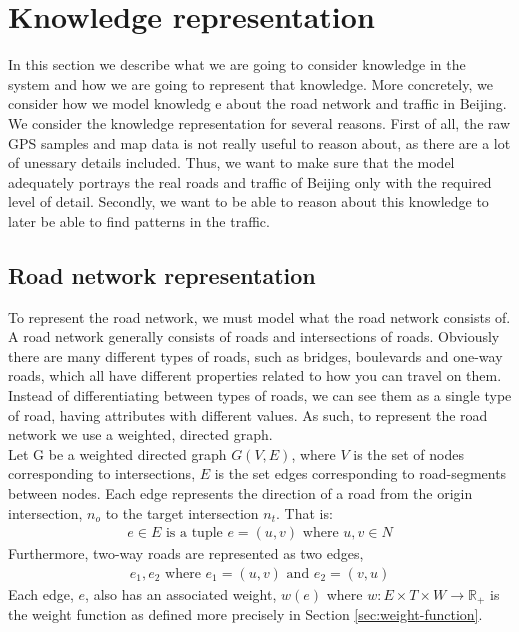 \section{Knowledge representation}
In this section we describe what we are going to consider knowledge in the system and how we are going to represent that knowledge. More concretely, we consider how we model knowledg
e about the road network and traffic in Beijing. We consider the knowledge representation for several reasons. First of all, the raw GPS samples and map data is not really useful to reason about, as there are a lot of unessary details included. Thus, we want to make sure that the model adequately portrays the real roads and traffic of Beijing only with the required level of detail. Secondly, we want to be able to reason about this knowledge to later be able to find patterns in the traffic.

\subsection{Road network representation}\label{sec:road-network-rep}
To represent the road network, we must model what the road network consists of. A road network generally consists of roads and intersections of roads. Obviously there are many different types of roads, such as bridges, boulevards and one-way roads, which all have different properties related to how you can travel on them. Instead of differentiating between types of roads, we can see them as a single type of road, having attributes with different values. As such, to represent the road network we use a weighted, directed graph.\\
Let G be a weighted directed graph $G(V,E)$, where $V$ is the set of nodes corresponding to intersections, $E$ is the set edges corresponding to road-segments between nodes. Each edge represents the direction of a road from the origin intersection, $n_o$ to the target intersection $n_t$. That is:
\begin{align*}
  e \in E \text{ is a tuple } e=(u, v) \text{ where } u, v \in N
\end{align*}
Furthermore, two-way roads are represented as two edges,
\begin{align*}
  e_1, e_2 \text{ where } e_1 = (u, v) \text{ and } e_2=(v, u)
\end{align*}
Each edge, $e$, also has an associated weight, $w(e)$ where  $w: E \times T \times W \rightarrow \mathbb R_+$ is the weight function as defined more precisely in Section \ref{sec:weight-function}. 

